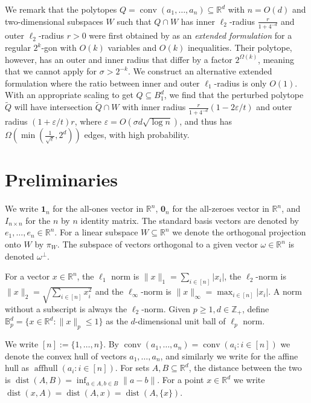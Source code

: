 \documentclass{theoretics}
\newcommand{\R}{\mathbb R}
\newcommand{\Z}{\mathbb Z}
\newcommand{\aff}{\operatorname{affhull}}
\renewcommand{\epsilon}{\varepsilon} %
\newcommand{\conv}{\operatorname{conv}}
\newcommand{\dist}{\operatorname{dist}}
\renewcommand{\subset}{\subseteq}
\begin{document}
We remark that the polytopes $Q = \conv(a_1,\dots,a_n) \subset \R^d$ with $n = O(d)$ and two-dimensional subspaces $W$
such that $Q \cap W$ has inner $\ell_2$-radius $\frac{r}{1+4^{-d}}$ and outer $\ell_2$-radius $r > 0$
were first obtained by \cite{BN01} as an \emph{extended formulation} for
a regular $2^k$-gon with $O(k)$ variables and $O(k)$ inequalities.
Their polytope, however, has an outer and inner radius that differ by a factor $2^{\Omega(k)}$,
meaning that we cannot apply  for $\sigma > 2^{-k}$.
We construct an alternative extended formulation where the ratio between
inner and outer $\ell_1$-radius is only $O(1)$.
With an appropriate scaling to get $Q \subset B_1^d$,
we find that the perturbed polytope $\tilde Q$ will have intersection
$\tilde Q \cap W$ with inner radius $\frac{r}{1+4^{-d}}(1-2\epsilon/t)$ and outer radius $(1+\epsilon/t)r$,
where $\epsilon = O(\sigma d \sqrt{\log n})$, and thus has
$\Omega(\min(\frac{1}{\sqrt \epsilon},2^d))$ edges,
with high probability.




\section{Preliminaries}
We write $\mathbf 1_n$ for the all-ones vector in $\R^n$, $\mathbf 0_n$ for the all-zeroes vector in $\R^n$,
and $I_{n \times n}$ for the $n$ by $n$ identity matrix. The standard basis vectors are denoted by $e_1,\dots,e_n \in \R^n$.
For a linear subspace $W \subset \R^n$ we denote the orthogonal projection onto $W$ by $\pi_W$.
The subspace of vectors orthogonal to a given vector $\omega \in \R^n$ is denoted $\omega^\perp$.

For a vector $x \in \R^n$, the $\ell_1$ norm is $\|x\|_1 = \sum_{i\in[n]} |x_i|$, the $\ell_2$-norm is $\|x\|_2 = \sqrt{\sum_{i\in[n]} x_i^2}$
and the $\ell_\infty$-norm is $\|x\|_\infty = \max_{i\in[n]} |x_i|$.
A norm without a subscript is always the $\ell_2$-norm.
Given $p \geq 1, d \in \Z_+$, define $\mathbb{B}_p^d = \{x \in \R^d : \|x\|_p \leq 1\}$ as the $d$-dimensional unit ball of $\ell_p$ norm.

We write $[n] := \{1,\dots,n\}$. By $\conv(a_1,\dots,a_n) = \conv(a_i : i \in [n])$ we denote the convex hull of vectors $a_1,\dots,a_n$,
and similarly we write for the affine hull as $\aff(a_i : i \in [n])$.
For sets $A, B \subset \R^d$, the distance between the two is
$\dist(A, B) = \inf_{a \in A, b \in B} \|a-b\|$.
For a point $x \in \R^d$ we write $\dist(x, A) = \dist(A, x) = \dist(A, \{x\})$.
\end{document}
